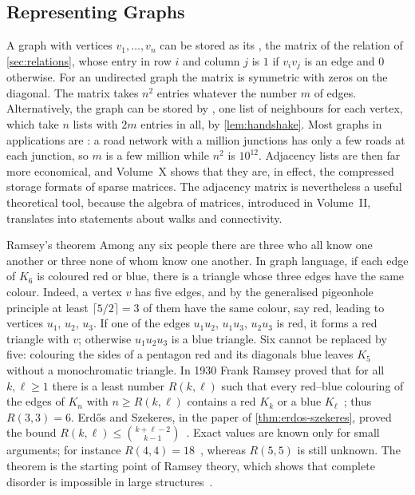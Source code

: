 \subsection{Representing Graphs}

A graph with vertices $v_1,\ldots,v_n$ can be stored as its , the matrix of the relation of \cref{sec:relations}, whose entry in row $i$ and column $j$ is $1$ if $v_iv_j$ is an edge and $0$ otherwise. For an undirected graph the matrix is symmetric with zeros on the diagonal. The matrix takes $n^2$ entries whatever the number $m$ of edges. Alternatively, the graph can be stored by , one list of neighbours for each vertex, which take $n$ lists with $2m$ entries in all, by \cref{lem:handshake}. Most graphs in applications are : a road network with a million junctions has only a few roads at each junction, so $m$ is a few million while $n^2$ is $10^{12}$. Adjacency lists are then far more economical, and Volume~X shows that they are, in effect, the compressed storage formats of sparse matrices. The adjacency matrix is nevertheless a useful theoretical tool, because the algebra of matrices, introduced in Volume~II, translates into statements about walks and connectivity.

\begin{note}{Ramsey's theorem}
Among any six people there are three who all know one another or three none of whom know one another. In graph language, if each edge of $K_6$ is coloured red or blue, there is a triangle whose three edges have the same colour. Indeed, a vertex $v$ has five edges, and by the generalised pigeonhole principle at least $\lceil5/2\rceil=3$ of them have the same colour, say red, leading to vertices $u_1$, $u_2$, $u_3$. If one of the edges $u_1u_2$, $u_1u_3$, $u_2u_3$ is red, it forms a red triangle with $v$; otherwise $u_1u_2u_3$ is a blue triangle. Six cannot be replaced by five: colouring the sides of a pentagon red and its diagonals blue leaves $K_5$ without a monochromatic triangle. In 1930 Frank Ramsey proved that for all $k,\ell\ge1$ there is a least number $R(k,\ell)$ such that every red--blue colouring of the edges of $K_n$ with $n\ge R(k,\ell)$ contains a red $K_k$ or a blue $K_\ell$~\cite{ramsey1930}; thus $R(3,3)=6$. Erd\H{o}s and Szekeres, in the paper of \cref{thm:erdos-szekeres}, proved the bound $R(k,\ell)\le\binom{k+\ell-2}{k-1}$~\cite{erdos1935}. Exact values are known only for small arguments; for instance $R(4,4)=18$~\cite{greenwood1955}, whereas $R(5,5)$ is still unknown. The theorem is the starting point of Ramsey theory, which shows that complete disorder is impossible in large structures~\cite{graham1990ramsey}.
\end{note}

